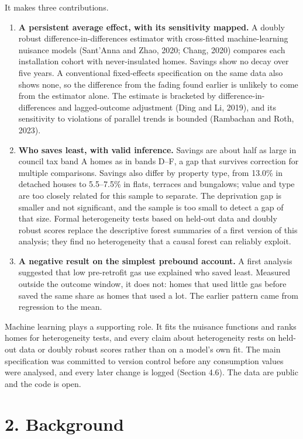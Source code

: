 \documentclass[11pt,a4paper]{article}
\providecommand{\tightlist}{\setlength{\itemsep}{0pt}\setlength{\parskip}{0pt}}
\begin{document}
It makes three contributions.

\begin{enumerate}
\def\labelenumi{\arabic{enumi}.}
\tightlist
\item
  \textbf{A persistent average effect, with its sensitivity mapped.} A doubly robust difference-in-differences estimator with cross-fitted machine-learning nuisance models (Sant'Anna and Zhao, 2020; Chang, 2020) compares each installation cohort with never-insulated homes. Savings show no decay over five years. A conventional fixed-effects specification on the same data also shows none, so the difference from the fading found earlier is unlikely to come from the estimator alone. The estimate is bracketed by difference-in-differences and lagged-outcome adjustment (Ding and Li, 2019), and its sensitivity to violations of parallel trends is bounded (Rambachan and Roth, 2023).
\item
  \textbf{Who saves least, with valid inference.} Savings are about half as large in council tax band A homes as in bands D--F, a gap that survives correction for multiple comparisons. Savings also differ by property type, from 13.0\% in detached houses to 5.5--7.5\% in flats, terraces and bungalows; value and type are too closely related for this sample to separate. The deprivation gap is smaller and not significant, and the sample is too small to detect a gap of that size. Formal heterogeneity tests based on held-out data and doubly robust scores replace the descriptive forest summaries of a first version of this analysis; they find no heterogeneity that a causal forest can reliably exploit.
\item
  \textbf{A negative result on the simplest prebound account.} A first analysis suggested that low pre-retrofit gas use explained who saved least. Measured outside the outcome window, it does not: homes that used little gas before saved the same share as homes that used a lot. The earlier pattern came from regression to the mean.
\end{enumerate}

Machine learning plays a supporting role. It fits the nuisance functions and ranks homes for heterogeneity tests, and every claim about heterogeneity rests on held-out data or doubly robust scores rather than on a model's own fit. The main specification was committed to version control before any consumption values were analysed, and every later change is logged (Section 4.6). The data are public and the code is open.

\section*{2. Background}
\end{document}
